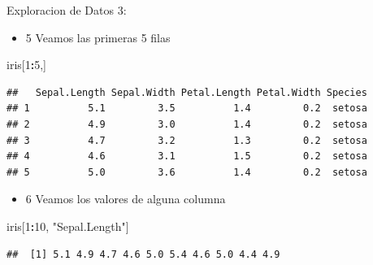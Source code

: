 \documentclass[ignorenonframetext,]{beamer}
\newenvironment{Shaded}{\begin{snugshade}}{\end{snugshade}}
\newcommand{\DecValTok}[1]{\textcolor[rgb]{0.00,0.00,0.81}{#1}}
\newcommand{\StringTok}[1]{\textcolor[rgb]{0.31,0.60,0.02}{#1}}
\newcommand{\OperatorTok}[1]{\textcolor[rgb]{0.81,0.36,0.00}{\textbf{#1}}}
\newcommand{\NormalTok}[1]{#1}
\providecommand{\tightlist}{%
  \setlength{\itemsep}{0pt}\setlength{\parskip}{0pt}}
\begin{document}
\begin{frame}[fragile]{Exploracion de Datos 3:}

\begin{itemize}
\tightlist
\item
  5 Veamos las primeras 5 filas
\end{itemize}

\begin{Shaded}
\begin{Highlighting}[]
\NormalTok{iris[}\DecValTok{1}\OperatorTok{:}\DecValTok{5}\NormalTok{,]}
\end{Highlighting}
\end{Shaded}

\begin{verbatim}
##   Sepal.Length Sepal.Width Petal.Length Petal.Width Species
## 1          5.1         3.5          1.4         0.2  setosa
## 2          4.9         3.0          1.4         0.2  setosa
## 3          4.7         3.2          1.3         0.2  setosa
## 4          4.6         3.1          1.5         0.2  setosa
## 5          5.0         3.6          1.4         0.2  setosa
\end{verbatim}

\begin{itemize}
\tightlist
\item
  6 Veamos los valores de alguna columna
\end{itemize}

\begin{Shaded}
\begin{Highlighting}[]
\NormalTok{iris[}\DecValTok{1}\OperatorTok{:}\DecValTok{10}\NormalTok{, }\StringTok{"Sepal.Length"}\NormalTok{]}
\end{Highlighting}
\end{Shaded}

\begin{verbatim}
##  [1] 5.1 4.9 4.7 4.6 5.0 5.4 4.6 5.0 4.4 4.9
\end{verbatim}

\end{frame}
\end{document}

